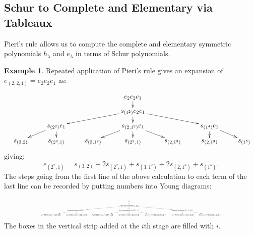 \documentclass[11pt]{amsproc}
\theoremstyle{definition}
\theoremstyle{example}
\newtheorem{example}[theorem]{Example}
\begin{document}
\subsection{Schur to Complete and Elementary via Tableaux}
Pieri's rule allows us to compute the complete and elementary symmetric polynomials $h_\lambda$ and $e_\lambda$ in terms of Schur polynomials.
\begin{example}
  \label{example:expansion-e}
  Repeated application of Pieri's rule gives an expansion of $e_{(2, 2, 1)} = e_2e_2e_1$ as:
  \begin{displaymath}
    \resizebox{\textwidth}{!}{
      \xymatrix@R-15pt{
        &&&e_2 e_2 e_1\ar[d]&&&\\
        &&&s_{(1^2)} e_2 e_1\ar[dll]\ar[d]\ar[drr]&&\\
        &s_{(2^2)}e_1\ar[dl]\ar[d] && s_{(2, 1^2)}e_1\ar[dl]\ar[d]\ar[dr] && s_{(1^4)}e_1 \ar[d]\ar[dr]&\\
        s_{(3, 2)} & s_{(2^2, 1)} & s_{(3, 1^2)} & s_{(2^2, 1)} & s_{(2, 1^3)} & s_{(2, 1^3)} & s_{(1^5)}
      }
    }
  \end{displaymath}
  giving:
  \begin{displaymath}
    e_{(2^2,1)} = s_{(3,2)} + 2s_{(2^2,1)} + s_{(3,1^2)} + 2s_{(2,1^3)} + s_{(1^5)}.
  \end{displaymath}
  The steps going from the first line of the above calculation to each term of the last line can be recorded by putting numbers into Young diagrams:
  \begin{displaymath}
    \resizebox{0.75\textwidth}{!}{
      \xymatrix@R-15pt{
        &&&\emptyset\ar[d]&&&\\
        &&&\ytableaushort{1,1}\ar[dll]\ar[d]\ar[drr]&&\\
        &\ytableaushort{12,12}\ar[dl]\ar[d] && \ytableaushort{12,1,2}\ar[dl]\ar[d]\ar[dr] && \ytableaushort{1,1,2,2}\ar[d]\ar[dr]&\\
        \ytableaushort{123,12} & \ytableaushort{12,12,3} & \ytableaushort{123,1,2} & \ytableaushort{12,13,2} & \ytableaushort{12,1,2,3} & \ytableaushort{13,1,2,2} & \ytableaushort{1,1,2,2,3}
      }
    }
  \end{displaymath}
  The boxes in the vertical strip added at the $i$th stage are filled with $i$.
\end{example}
\end{document}
